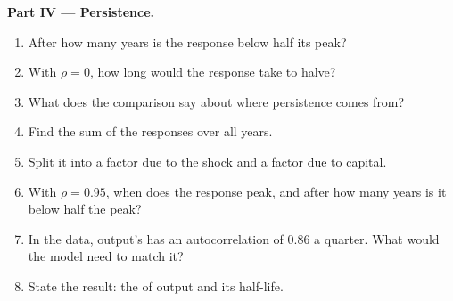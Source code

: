 \begin{problem}
\medskip
\noindent\textbf{Part IV --- Persistence.}
\begin{enumerate}[resume]
  \item After how many years is the response below half its peak?
  \item With $\rho = 0$, how long would the response take to halve?
  \item What does the comparison say about where persistence comes from?
  \item Find the sum of the responses over all years.
  \item Split it into a factor due to the shock and a factor due to capital.
  \item With $\rho = 0.95$, when does the response peak, and after how many years is it below half the peak?
  \item In the data, output's  has an autocorrelation of 0.86 a quarter. What would the model need to match it?
  \item State the result: the  of output and its half-life.
\end{enumerate}
\end{problem}
